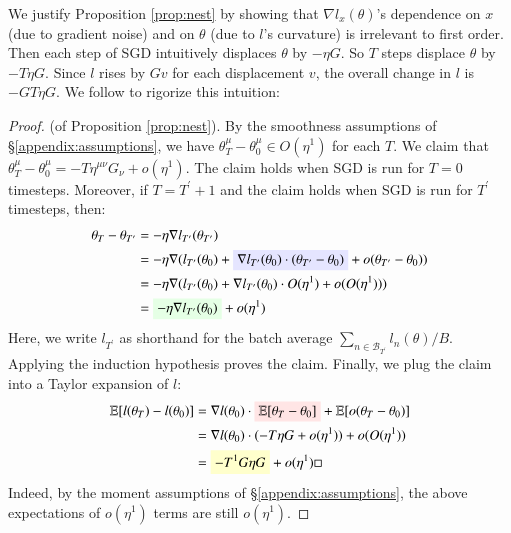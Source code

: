 \documentclass[anon,12pt]{colt2021} %
\newcommand{\pr}{\prime}
\newcommand{\expc}{\mathbb{E}}
\newcommand{\Bb}{\mathcal{B}}
\begin{document}
            We justify Proposition \ref{prop:nest} by showing that $\nabla
            l_x(\theta)$'s dependence on $x$ (due to gradient noise) and on
            $\theta$ (due to $l$'s curvature) is irrelevant to first order.
            Then each step of SGD intuitively displaces $\theta$ by $-\eta G$.
            So $T$ steps displace $\theta$ by $-T\eta G$.  Since $l$ rises by
            $Gv$ for each displacement $v$, the overall change in $l$ is
            $-GT\eta G$.  We follow \cite{ne04,ro18} to rigorize this
            intuition:
            \begin{proof} (of Proposition \ref{prop:nest}).
                By the smoothness assumptions of \S\ref{appendix:assumptions},
                we have $\theta_T^\mu - \theta_0^\mu \in O(\eta^1)$ for each
                $T$.  We claim that $\theta_T^\mu - \theta_0^\mu =%
                -T\eta^{\mu\nu}G_\nu + o(\eta^1)$.
                The claim holds when SGD is run for $T=0$ timesteps.  Moreover,
                if $T = T^\pr+1$ and the claim holds when SGD is run for
                $T^\pr$ timesteps, then: 
                \begin{align*}
                    \theta_{T} - \theta_{T^\pr}
                    &= - \eta \nabla l_{T^\pr}(\theta_{T^\pr}) \\
                    &= - \eta \nabla (l_{T^\pr}(\theta_0) + \text{\colorbox{moosky}{$\nabla l_{T^\pr}(\theta_0) \cdot (\theta_{T^\pr} - \theta_0)$}} + o(\theta_{T^\pr} - \theta_0)) \\ 
                    &= - \eta \nabla (l_{T^\pr}(\theta_0) + \nabla l_{T^\pr}(\theta_0) \cdot O(\eta^1) + o(O(\eta^1))) \\
                    &= \text{\colorbox{moolime}{$- \eta \nabla l_{T^\pr}(\theta_0)$}} + o(\eta^1)
                \end{align*}
                Here, we write $l_{T^\pr}$ as shorthand for the batch average
                $\sum_{n\in \Bb_{T^\pr}} l_n(\theta) / B$.  Applying the induction
                hypothesis proves the claim.
                Finally, we plug the claim into a Taylor expansion of $l$: 
                \begin{align*}
                    \expc[l(\theta_T) - l(\theta_0)]
                    &= \nabla l(\theta_0) \cdot \text{\colorbox{moopink}{$\expc[\theta_T - \theta_0]$}} + \expc[o(\theta_T - \theta_0)] \\
                    &= \nabla l(\theta_0) \cdot (-T\eta G + o(\eta^1)) + o(O(\eta^1)) \\
                    &= \text{\colorbox{moogold}{$-T^1G\eta G$}}+ o(\eta^1) \hfill \square
                \end{align*}
                Indeed, by the moment assumptions of \S\ref{appendix:assumptions}, the
                above expectations of $o(\eta^1)$ terms are still $o(\eta^1)$.
            \end{proof}
\end{document}
